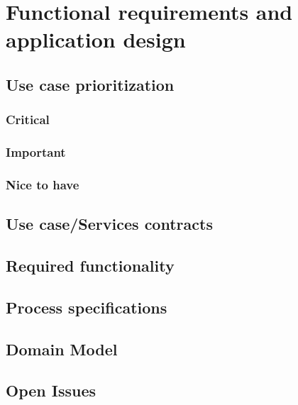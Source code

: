 \documentclass[a4paper, 10pt, oneside]{report}
\begin{document}
\chapter{ Functional requirements and application design}
	\section{Use case prioritization}
		\subsection{Critical}
		\subsection{Important}
		\subsection{Nice to have}
	\section{Use case/Services contracts}

\newpage

\newpage

\newpage

\newpage

\newpage

\newpage

\newpage

\newpage
%

\newpage

\newpage

\newpage

\section{Required functionality}
\section{Process specifications}
\section{Domain Model}
\section{Open Issues}
\end{document}
